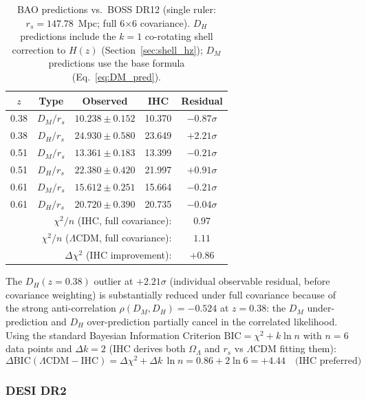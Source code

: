 \documentclass[12pt,a4paper]{article}
\begin{document}
\begin{table}[htbp]
\centering
\caption{BAO predictions vs.\ BOSS DR12 (single ruler: $r_s = 147.78$~Mpc; full 6$\times$6 covariance). $D_H$ predictions include the $k=1$ co-rotating shell correction to $H(z)$ (Section~\ref{sec:shell_hz}); $D_M$ predictions use the base formula (Eq.~\ref{eq:DM_pred}).}
\label{tab:bao}
\begin{tabular}{ccccc}
\toprule
$z$ & Type & Observed & IHC & Residual \\
\midrule
0.38 & $D_M/r_s$ & $10.238 \pm 0.152$ & 10.370 & $-0.87\sigma$ \\
0.38 & $D_H/r_s$ & $24.930 \pm 0.580$ & 23.649 & $+2.21\sigma$ \\
0.51 & $D_M/r_s$ & $13.361 \pm 0.183$ & 13.399 & $-0.21\sigma$ \\
0.51 & $D_H/r_s$ & $22.380 \pm 0.420$ & 21.997 & $+0.91\sigma$ \\
0.61 & $D_M/r_s$ & $15.612 \pm 0.251$ & 15.664 & $-0.21\sigma$ \\
0.61 & $D_H/r_s$ & $20.720 \pm 0.390$ & 20.735 & $-0.04\sigma$ \\
\midrule
\multicolumn{4}{r}{$\chi^2/n$ (IHC, full covariance):} & $0.97$ \\
\multicolumn{4}{r}{$\chi^2/n$ ($\Lambda$CDM, full covariance):} & $1.11$ \\
\multicolumn{4}{r}{$\Delta\chi^2$ (IHC improvement):} & $+0.86$ \\
\bottomrule
\end{tabular}
\end{table}

The $D_H(z=0.38)$ outlier at $+2.21\sigma$ (individual observable residual, before covariance weighting) is substantially reduced under
full covariance because of the strong anti-correlation $\rho(D_M, D_H) = -0.524$ at
$z = 0.38$: the $D_M$ under-prediction and $D_H$ over-prediction partially cancel in
the correlated likelihood. Using the standard Bayesian Information Criterion
$\mathrm{BIC} = \chi^2 + k\ln n$ with $n = 6$ data points and $\Delta k = 2$ (IHC
derives both $\Omega_\Lambda$ and $r_s$ vs $\Lambda$CDM fitting them):
\begin{equation}
  \Delta\mathrm{BIC}(\Lambda\mathrm{CDM}-\mathrm{IHC})
  = \Delta\chi^2 + \Delta k\,\ln n
  = 0.86 + 2\ln 6 = +4.44 \quad\text{(IHC preferred)}
\end{equation}

\subsubsection{DESI DR2}
\end{document}
